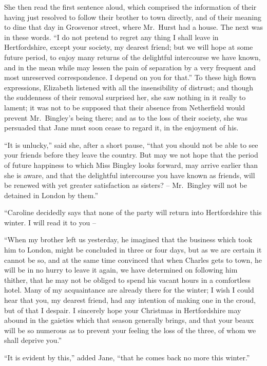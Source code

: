 She then read the first sentence aloud, which comprised
the information of their having just resolved to follow
their brother to town directly, and of their meaning to
dine that day in Grosvenor street, where Mr.\ Hurst had
a house. The next was in these words. “I do not pretend
to regret any thing I shall leave in Hertfordshire, except
your society, my dearest friend; but we will hope at
some future period, to enjoy many returns of the delightful
intercourse we have known, and in the mean while may
lessen the pain of separation by a very frequent and most
unreserved correspondence. I depend on you for that.”
To these high flown expressions, Elizabeth listened with all
the insensibility of distrust; and though the suddenness
of their removal surprised her, she saw nothing in it really
to lament; it was not to be supposed that their absence
from Netherfield would prevent Mr.\ Bingley’s being there;
and as to the loss of their society, she was persuaded that
Jane must soon cease to regard it, in the enjoyment of his.

“It is unlucky,” said she, after a short pause, “that
you should not be able to see your friends before they
leave the country. But may we not hope that the period
of future happiness to which Miss Bingley looks forward,
may arrive earlier than she is aware, and that the delightful
intercourse you have known as friends, will be renewed
with yet greater satisfaction as sisters? -- Mr.\ Bingley will
not be detained in London by them.”

“Caroline decidedly says that none of the party will
return into Hertfordshire this winter. I will read it to
you --

“When my brother left us yesterday, he imagined
that the business which took him to London, might be
concluded in three or four days, but as we are certain
it cannot be so, and at the same time convinced that
when Charles gets to town, he will be in no hurry to leave
it again, we have determined on following him thither,
that he may not be obliged to spend his vacant hours in
a comfortless hotel. Many of my acquaintance are already
there for the winter; I wish I could hear that you, my
dearest friend, had any intention of making one in the
croud, but of that I despair. I sincerely hope your Christmas
in Hertfordshire may abound in the gaieties which
that season generally brings, and that your beaux will be
so numerous as to prevent your feeling the loss of the three,
of whom we shall deprive you.”

“It is evident by this,” added Jane, “that he comes
back no more this winter.”

